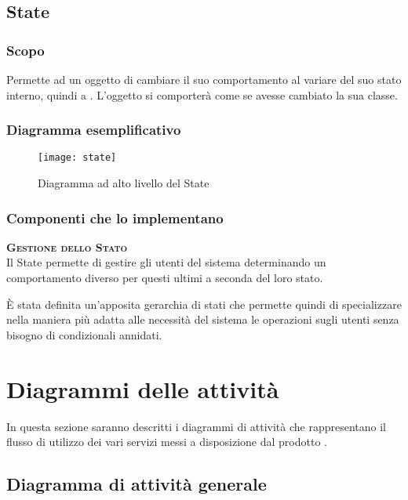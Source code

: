 \subsection{State}

\subsubsection{Scopo}
Permette ad un oggetto di cambiare il suo comportamento al variare del suo stato interno, quindi a . L'oggetto si comporterà come se avesse cambiato la sua classe.

\subsubsection{Diagramma esemplificativo}
\begin{figure}[H]
\centering
\texttt{[image: state]}
\caption{Diagramma ad alto livello del  State}\label{fig:state}
\end{figure}

\subsubsection{Componenti che lo implementano}
\begin{description}
\item{\scshape\bfseries Gestione dello Stato}\\
Il  State permette di gestire gli utenti del sistema determinando un comportamento diverso per questi ultimi a seconda del loro stato.

È stata definita un'apposita gerarchia di stati che permette quindi di specializzare nella maniera più adatta alle necessità del sistema le operazioni sugli utenti senza bisogno di condizionali annidati.
\end{description}
\clearpage

\section{Diagrammi delle attività}
In questa sezione saranno descritti i diagrammi di attività che rappresentano il flusso di utilizzo dei vari servizi messi a disposizione dal prodotto \caName.

\subsection{Diagramma di attività generale}

